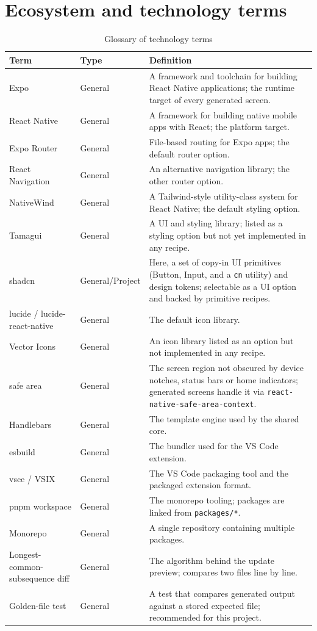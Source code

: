\section{Ecosystem and technology terms}

\begin{longtable}{p{3.8cm}p{1.6cm}p{8.8cm}}
\caption{Glossary of technology terms}\\
\toprule
\textbf{Term} & \textbf{Type} & \textbf{Definition} \\
\midrule

Expo & General & A framework and toolchain for building React Native applications;
the runtime target of every generated screen. \\
React Native & General & A framework for building native mobile apps with React;
the platform target. \\
Expo Router & General & File-based routing for Expo apps; the default router
option. \\
React Navigation & General & An alternative navigation library; the other router
option. \\
NativeWind & General & A Tailwind-style utility-class system for React Native; the
default styling option. \\
Tamagui & General & A UI and styling library; listed as a styling option but not
yet implemented in any recipe. \\
shadcn & General/Project & Here, a set of copy-in UI primitives (Button, Input,
and a \texttt{cn} utility) and design tokens; selectable as a UI option and
backed by primitive recipes. \\
lucide / lucide-react-native & General & The default icon library. \\
Vector Icons & General & An icon library listed as an option but not implemented in
any recipe. \\
safe area & General & The screen region not obscured by device notches, status
bars or home indicators; generated screens handle it via
\texttt{react-native-safe-area-context}. \\
Handlebars & General & The template engine used by the shared core. \\
esbuild & General & The bundler used for the VS Code extension. \\
vsce / VSIX & General & The VS Code packaging tool and the packaged extension
format. \\
pnpm workspace & General & The monorepo tooling; packages are linked from
\texttt{packages/*}. \\
Monorepo & General & A single repository containing multiple packages. \\
Longest-common-subsequence diff & General & The algorithm behind the update
preview; compares two files line by line. \\
Golden-file test & General & A test that compares generated output against a
stored expected file; recommended for this project. \\
\bottomrule
\end{longtable}

